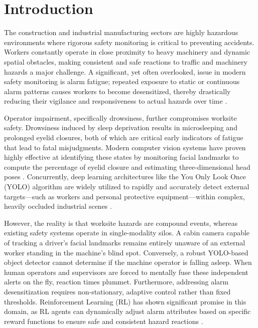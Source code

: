 \section{Introduction}
\label{sec:introduction}

The construction and industrial manufacturing sectors are highly hazardous environments where rigorous safety monitoring is critical to preventing accidents. Workers constantly operate in close proximity to heavy machinery and dynamic spatial obstacles, making consistent and safe reactions to traffic and machinery hazards a major challenge. A significant, yet often overlooked, issue in modern safety monitoring is alarm fatigue; repeated exposure to static or continuous alarm patterns causes workers to become desensitized, thereby drastically reducing their vigilance and responsiveness to actual hazards over time \cite{lu2025reinforcement}. 

Operator impairment, specifically drowsiness, further compromises worksite safety. Drowsiness induced by sleep deprivation results in microsleeping and prolonged eyelid closures, both of which are critical early indicators of fatigue that lead to fatal misjudgments. Modern computer vision systems have proven highly effective at identifying these states by monitoring facial landmarks to compute the percentage of eyelid closure and estimating three-dimensional head poses \cite{owen2025drowsiness}. Concurrently, deep learning architectures like the You Only Look Once (YOLO) algorithm are widely utilized to rapidly and accurately detect external targets—such as workers and personal protective equipment—within complex, heavily occluded industrial scenes \cite{chen2023yolo}.

However, the reality is that worksite hazards are compound events, whereas existing safety systems operate in single-modality silos. A cabin camera capable of tracking a driver's facial landmarks remains entirely unaware of an external worker standing in the machine's blind spot. Conversely, a robust YOLO-based object detector cannot determine if the machine operator is falling asleep. When human operators and supervisors are forced to mentally fuse these independent alerts on the fly, reaction times plummet. Furthermore, addressing alarm desensitization requires non-stationary, adaptive control rather than fixed thresholds. Reinforcement Learning (RL) has shown significant promise in this domain, as RL agents can dynamically adjust alarm attributes based on specific reward functions to ensure safe and consistent hazard reactions \cite{lu2025reinforcement}. 

